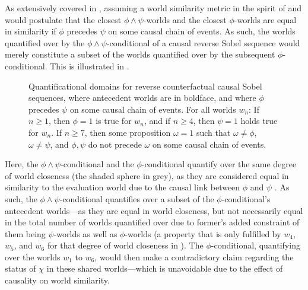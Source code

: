 As extensively covered in , assuming a world similarity metric in the spirit of \textcite{Bennett2003} and \textcite{Arregui2009} would postulate that the closest $\phi\land\psi$-worlds and the closest $\phi$-worlds are equal in similarity if $\phi$ precedes $\psi$ on some causal chain of events. As such, the worlds quantified over by the $\phi\land\psi$-conditional of a causal reverse Sobel sequence would merely constitute a subset of the worlds quantified over by the subsequent $\phi$-conditional. This is illustrated in .
\begin{figure}[!htb]

\caption{Quantificational domains for reverse counterfactual causal Sobel sequences, where antecedent worlds are in boldface, and where $\phi$ precedes $\psi$ on some causal chain of events. For all worlds $w_n$: If $n\geqslant1$, then $\phi=1$ is true for $w_n$, and if $n\geqslant 4$, then $\psi=1$ holds true for $w_n$. If $n\geqslant 7$, then some proposition $\omega=1$ such that $\omega\neq\phi$, $\omega\neq\psi$, and $\phi,\psi$ do not precede $\omega$ on some causal chain of events.}
\end{figure}

\noindent Here, the $\phi\land\psi$-conditional and the $\phi$-conditional quantify over the same degree of world closeness (the shaded sphere in grey), as they are considered equal in similarity to the evaluation world due to the causal link between $\phi$ and $\psi$ \parencite{Bennett2003,Arregui2009}. As such, the $\phi\land\psi$-conditional quantifies over a subset of the $\phi$-conditional's antecedent worlds---as they are equal in world closeness, but not necessarily equal in the total number of worlds quantified over due to former's added constraint of them being $\psi$-worlds as well as $\phi$-worlds (a property that is only fulfilled by $w_4$, $w_5$, and $w_6$ for that degree of world closeness in ). The $\phi$-conditional, quantifying over the worlds $w_1$ to $w_6$, would then make a contradictory claim regarding the status of $\chi$ in these shared worlds---which is unavoidable due to the effect of causality on world similarity.

